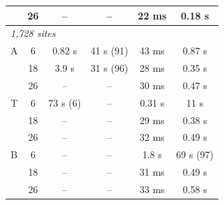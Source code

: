 \begin{tabular}{cccccc}
 & 26 & -- & -- & 22 ms & 0.18 s \\
\hline
\multicolumn{6}{l}{\textit{1,728 sites}} \\
A & 6 & 0.82 s & 41 s (91) & 43 ms & 0.87 s \\
 & 18 & 3.9 s & 31 s (96) & 28 ms & 0.35 s \\
 & 26 & -- & -- & 30 ms & 0.47 s \\
T & 6 & 73 s (6) & -- & 0.31 s & 11 s \\
 & 18 & -- & -- & 29 ms & 0.38 s \\
 & 26 & -- & -- & 32 ms & 0.49 s \\
B & 6 & -- & -- & 1.8 s & 69 s (97) \\
 & 18 & -- & -- & 31 ms & 0.49 s \\
 & 26 & -- & -- & 33 ms & 0.58 s \\
\hline
\end{tabular}
